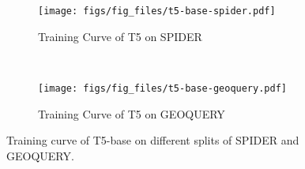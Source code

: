 \begin{figure*}[t!]
    \centering
    \begin{subfigure}[t]{0.5\textwidth}
        \centering
        \texttt{[image: figs/fig\_files/t5-base-spider.pdf]}
        \caption{\footnotesize Training Curve of T5 on SPIDER}
    \end{subfigure}%
    ~ 
    \begin{subfigure}[t]{0.5\textwidth}
        \centering
        \texttt{[image: figs/fig\_files/t5-base-geoquery.pdf]}
        \caption{\footnotesize Training Curve of T5 on GEOQUERY}
    \end{subfigure}
    \caption{Training curve of T5-base on different splits of SPIDER and GEOQUERY.}
    \label{fig:training-curve}
\end{figure*}
